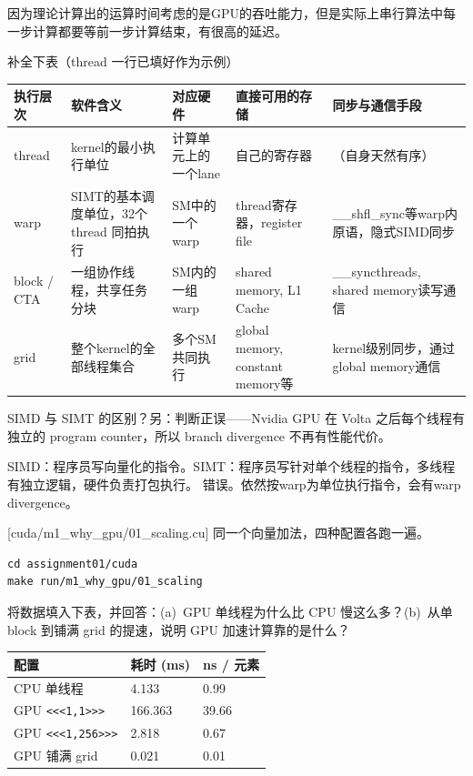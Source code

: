 \documentclass[11pt,a4paper,fontset=none]{ctexart}
\begin{document}
因为理论计算出的运算时间考虑的是GPU的吞吐能力，但是实际上串行算法中每一步计算都要等前一步计算结束，有很高的延迟。

补全下表（thread 一行已填好作为示例）

\begin{center}\small
\begin{tabular}{@{}p{5.2em}p{9em}p{7.5em}p{7.5em}p{8em}@{}}
\toprule
执行层次 & 软件含义 & 对应硬件 & 直接可用的存储 & 同步与通信手段 \\
\midrule
thread & kernel的最小执行单位 & 计算单元上的一个lane & 自己的寄存器 & （自身天然有序） \\
warp & SIMT的基本调度单位，32个thread 同拍执行 & SM中的一个warp & thread寄存器，register file & \_\_shfl\_sync等warp内原语，隐式SIMD同步 \\
block / CTA & 一组协作线程，共享任务分块 & SM内的一组warp & shared memory, L1 Cache & \_\_syncthreads, shared memory读写通信 \\
grid & 整个kernel的全部线程集合 & 多个SM共同执行 & global memory, constant memory等 & kernel级别同步，通过global memory通信 \\
\bottomrule
\end{tabular}
\end{center}

SIMD 与 SIMT 的区别？另：判断正误——Nvidia GPU 在 Volta 之后每个线程有独立的 program counter，所以 branch divergence 不再有性能代价。

SIMD：程序员写向量化的指令。SIMT：程序员写针对单个线程的指令，多线程有独立逻辑，硬件负责打包执行。
错误。依然按warp为单位执行指令，会有warp divergence。

[cuda/m1\_why\_gpu/01\_scaling.cu]
同一个向量加法，四种配置各跑一遍。

\begin{lstlisting}
cd assignment01/cuda
make run/m1_why_gpu/01_scaling
\end{lstlisting}

将数据填入下表，并回答：(a)~GPU 单线程为什么比 CPU 慢这么多？(b)~从单 block 到铺满 grid 的提速，说明 GPU 加速计算靠的是什么？

\begin{center}\small
\begin{tabular}{@{}lll@{}}
\toprule
配置 & 耗时 (ms) & ns / 元素 \\
\midrule
CPU 单线程 & 4.133 & 0.99 \\
GPU \texttt{<<<1,1>>>} & 166.363 & 39.66 \\
GPU \texttt{<<<1,256>>>} & 2.818 & 0.67 \\
GPU 铺满 grid & 0.021 & 0.01 \\
\bottomrule
\end{tabular}
\end{center}
\end{document}
